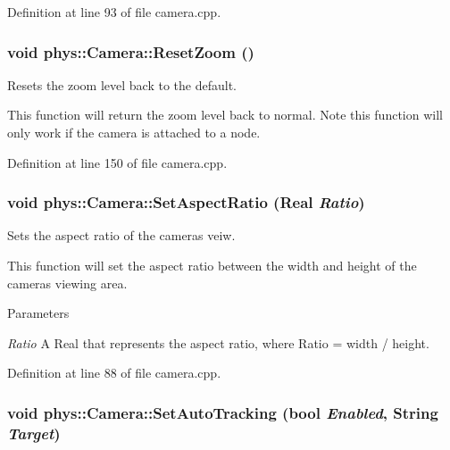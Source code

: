 Definition at line 93 of file camera.cpp.

\hypertarget{classphys_1_1Camera_a181465e6add36c07a63fdd26aee7c69a}{
\subsubsection[{ResetZoom}]{\setlength{\rightskip}{0pt plus 5cm}void phys::Camera::ResetZoom ()}}
\label{d9/df8/classphys_1_1Camera_a181465e6add36c07a63fdd26aee7c69a}


Resets the zoom level back to the default. 

This function will return the zoom level back to normal. Note this function will only work if the camera is attached to a node. 

Definition at line 150 of file camera.cpp.

\hypertarget{classphys_1_1Camera_a6f895759e653eedb985217c621b265f6}{
\subsubsection[{SetAspectRatio}]{\setlength{\rightskip}{0pt plus 5cm}void phys::Camera::SetAspectRatio ({\bf Real} {\em Ratio})}}
\label{d9/df8/classphys_1_1Camera_a6f895759e653eedb985217c621b265f6}


Sets the aspect ratio of the cameras veiw. 

This function will set the aspect ratio between the width and height of the cameras viewing area. 
\begin{DoxyParams}{Parameters}
\item[{\em Ratio}]A Real that represents the aspect ratio, where Ratio = width / height. \end{DoxyParams}


Definition at line 88 of file camera.cpp.

\hypertarget{classphys_1_1Camera_a5f66e37056f03767b6048f8bd4465983}{
\subsubsection[{SetAutoTracking}]{\setlength{\rightskip}{0pt plus 5cm}void phys::Camera::SetAutoTracking (bool {\em Enabled}, \/  {\bf String} {\em Target})}}
\label{d9/df8/classphys_1_1Camera_a5f66e37056f03767b6048f8bd4465983}


